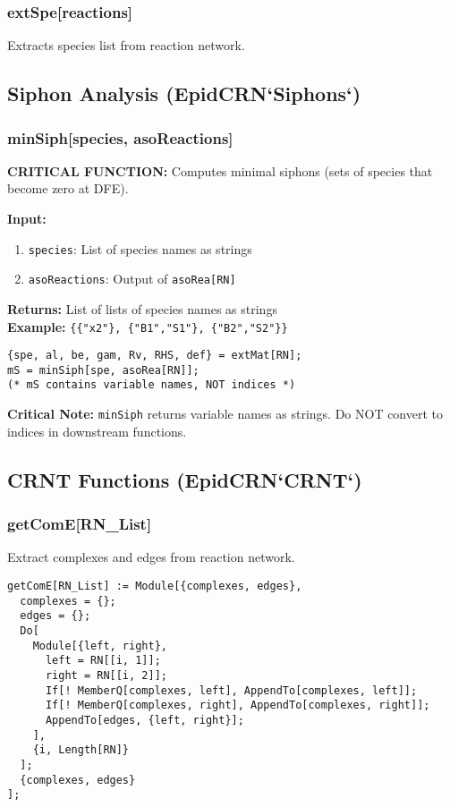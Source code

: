 \documentclass{article}
\begin{document}
\subsubsection{extSpe[reactions]}
Extracts species list from reaction network.

\subsection{Siphon Analysis (EpidCRN`Siphons`)}

\subsubsection{minSiph[species, asoReactions]}
\textbf{CRITICAL FUNCTION:} Computes minimal siphons (sets of species that become zero at DFE).

\textbf{Input:}
\begin{enumerate}
\item \texttt{species}: List of species names as strings
\item \texttt{asoReactions}: Output of \texttt{asoRea[RN]}
\end{enumerate}

\textbf{Returns:} List of lists of species names as strings\\
\textbf{Example:} \texttt{\{\{"x2"\}, \{"B1","S1"\}, \{"B2","S2"\}\}}

\begin{verbatim}
{spe, al, be, gam, Rv, RHS, def} = extMat[RN];
mS = minSiph[spe, asoRea[RN]];
(* mS contains variable names, NOT indices *)
\end{verbatim}

\textbf{Critical Note:} \texttt{minSiph} returns variable names as strings. Do NOT convert to indices in downstream functions.

\subsection{CRNT Functions (EpidCRN`CRNT`)}

\subsubsection{getComE[RN\_List]}
Extract complexes and edges from reaction network.

\begin{lstlisting}
getComE[RN_List] := Module[{complexes, edges},
  complexes = {};
  edges = {};
  Do[
    Module[{left, right},
      left = RN[[i, 1]];
      right = RN[[i, 2]];
      If[! MemberQ[complexes, left], AppendTo[complexes, left]];
      If[! MemberQ[complexes, right], AppendTo[complexes, right]];
      AppendTo[edges, {left, right}];
    ],
    {i, Length[RN]}
  ];
  {complexes, edges}
];
\end{lstlisting}
\end{document}
